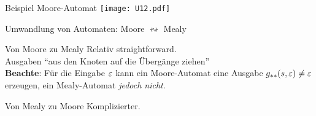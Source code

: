 \begin{frame}{Beispiel Moore-Automat}
	\texttt{[image: U12.pdf]}	
\end{frame}


\begin{frame}{Umwandlung von Automaten: Moore $\leftrightsquigarrow$ Mealy}
	\begin{block}{Von Moore zu Mealy}
		Relativ straightforward.\\
		Ausgaben \enquote{aus den Knoten auf die Übergänge ziehen}\\
		\medskip
		\textbf{Beachte}: Für die Eingabe $\varepsilon$ kann ein Moore-Automat eine Ausgabe $g_{**}(s, \varepsilon) \neq \varepsilon$ erzeugen, ein Mealy-Automat \emph{jedoch nicht}.
	\end{block}

	\begin{block}{Von Mealy zu Moore}
		Komplizierter.
	\end{block}
\end{frame}

